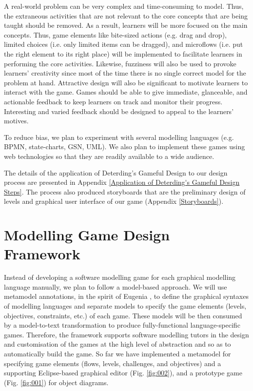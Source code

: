 \documentclass[12pt, a4paper]{report}
\begin{document}
{A real-world problem can be very complex and time-consuming to model. Thus, the extraneous activities that are not relevant to the core concepts that are being taught should be removed. As a result, learners will be more focused on the main concepts. Thus, game elements like bite-sized actions (e.g. drag and drop), limited choices (i.e. only limited items can be dragged), and microflows (i.e. put the right element to its right place) will be implemented to facilitate learners in performing the core activities. Likewise, fuzziness will also be used to provoke learners' creativity since most of the time there is no single correct model for the problem at hand. Attractive design will also be significant to motivate learners to interact with the game. Games should be able to give immediate, glanceable, and actionable feedback to keep learners on track and monitor their progress. Interesting and varied feedback should be designed to appeal to the learners' motives. 

To reduce bias, we plan to experiment with several modelling languages (e.g. BPMN, state-charts, GSN, UML). We also plan to implement these games using web technologies so that they are readily available to a wide audience.

The details of the application of Deterding's Gameful Design to our design process are presented in Appendix \ref{Application of Deterding's Gameful Design Steps}. The process also produced storyboards that are the preliminary design of levels and graphical user interface of our game (Appendix \ref{Storyboards}).      

\section{Modelling Game Design Framework}
Instead of developing a software modelling game for each graphical modelling language manually, we plan to follow a model-based approach. We will use metamodel annotations, in the spirit of Eugenia \cite{kolovos2015eugenia}, to define the graphical syntaxes of modelling languages and separate models to specify the game elements (levels, objectives, constraints, etc.) of each game. These models will be then consumed by a model-to-text transformation to produce fully-functional language-specific games. Therefore, the framework supports software modelling tutors in the design and customisation of the games at the high level of abstraction and so as to automatically build the game. So far we have implemented a metamodel for specifying game elements (flows, levels, challenges, and objectives) and a supporting Eclipse-based graphical editor (Fig. \ref{fig:002}), and a prototype game (Fig. \ref{fig:001}) for object diagrams. 

}
\end{document}

